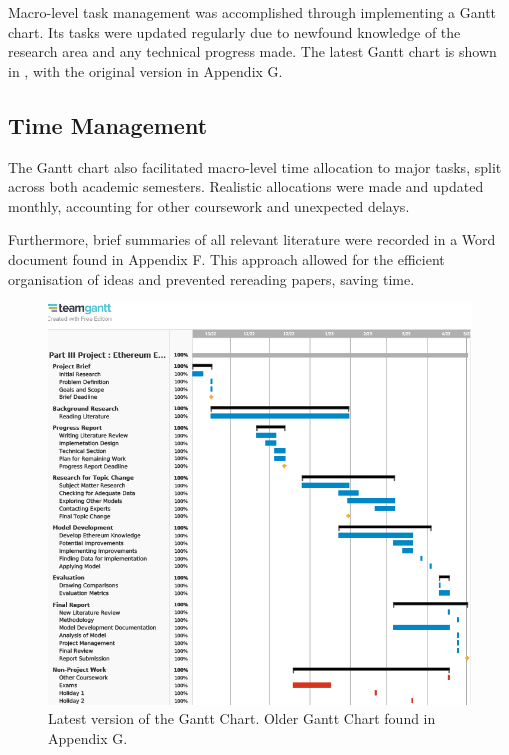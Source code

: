 Macro-level task management was accomplished through implementing a Gantt chart. Its tasks were updated regularly due to newfound knowledge of the research area and any technical progress made. The latest Gantt chart is shown in , with the original version in Appendix G. 

\subsection{Time Management}

The Gantt chart also facilitated macro-level time allocation to major tasks, split across both academic semesters. Realistic allocations were made and updated monthly, accounting for other coursework and unexpected delays. 

Furthermore, brief summaries of all relevant literature were recorded in a Word document found in Appendix F. This approach allowed for the efficient organisation of ideas and prevented rereading papers, saving time. 


\begin{figure}[!htb]
    \includegraphics[width=14cm,center]{Figures/ganttUpdated.png}
    \caption{Latest version of the Gantt Chart. Older Gantt Chart found in Appendix G.}
    \label{Figure:ganttUpdated}
\end{figure}




